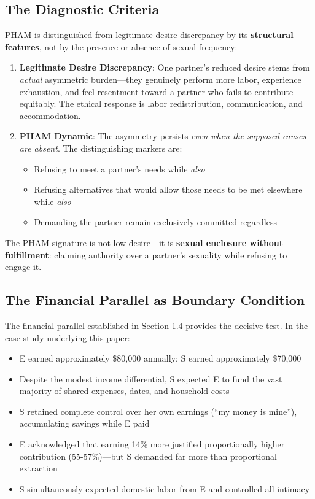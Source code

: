 \documentclass[12pt,openany]{book}
\numberwithin{equation}{chapter}
\begin{document}
\subsection{The Diagnostic Criteria}

PHAM is distinguished from legitimate desire discrepancy by its \textbf{structural features}, not by the presence or absence of sexual frequency:

\begin{enumerate}
    \item \textbf{Legitimate Desire Discrepancy}: One partner's reduced desire stems from \textit{actual} asymmetric burden---they genuinely perform more labor, experience exhaustion, and feel resentment toward a partner who fails to contribute equitably. The ethical response is labor redistribution, communication, and accommodation.
    
    \item \textbf{PHAM Dynamic}: The asymmetry persists \textit{even when the supposed causes are absent}. The distinguishing markers are:
    \begin{itemize}
        \item Refusing to meet a partner's needs while \textit{also}
        \item Refusing alternatives that would allow those needs to be met elsewhere while \textit{also}
        \item Demanding the partner remain exclusively committed regardless
    \end{itemize}
\end{enumerate}

The PHAM signature is not low desire---it is \textbf{sexual enclosure without fulfillment}: claiming authority over a partner's sexuality while refusing to engage it.

\subsection{The Financial Parallel as Boundary Condition}

The financial parallel established in Section 1.4 provides the decisive test. In the case study underlying this paper:

\begin{itemize}
    \item E earned approximately \$80,000 annually; S earned approximately \$70,000
    \item Despite the modest income differential, S expected E to fund the vast majority of shared expenses, dates, and household costs
    \item S retained complete control over her own earnings (``my money is mine''), accumulating savings while E paid
    \item E acknowledged that earning 14\% more justified proportionally higher contribution (55-57\%)---but S demanded far more than proportional extraction
    \item S simultaneously expected domestic labor from E and controlled all intimacy
\end{itemize}
\end{document}
